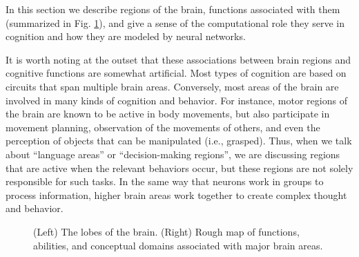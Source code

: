 In this section we describe regions of the brain, functions associated with them (summarized in Fig. \ref{brain_lobes}), and give a sense of the computational role they serve in cognition and how they are modeled by neural networks.

It is worth noting at the outset that these associations between brain regions and cognitive functions are somewhat artificial. Most types of cognition are based on circuits that span multiple brain areas. Conversely, most areas of the brain are involved in  many kinds of cognition and behavior. For instance, motor regions of the brain are known to be active in body movements, but  also participate in movement planning, observation of the movements of others, and even the perception of objects that can be manipulated (i.e., grasped). Thus, when we talk about ``language areas'' or ``decision-making regions'', we are discussing regions that are active when the relevant behaviors occur, but these regions are not solely responsible for such tasks. In the same way that neurons work in groups to process information, higher brain areas work together to create complex thought and behavior.

\begin{figure}[h]
\centering
{}
\hspace*{.2in}
\caption[Left: Pamela Payne; Right: Pamela Payne, using text taken from the Emergent Wiki.]{(Left) The lobes of the brain. (Right) Rough map of functions, abilities, and conceptual domains associated with major brain areas.}
\label{brain_lobes}
\end{figure}


